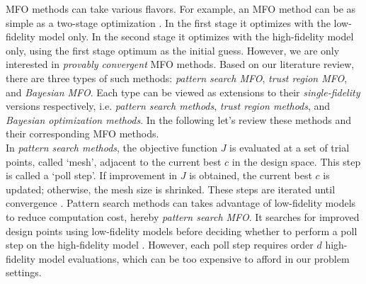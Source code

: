 \documentclass[a4paper,onecolumn]{article}
\theoremstyle{remark}
\begin{document}
\noindent MFO methods can take various flavors.
For example, an MFO method can be as simple as a two-stage optimization \cite{MFO: two stage}. 
In the first stage it optimizes with the low-fidelity model only. In the second stage
it optimizes with the high-fidelity model only, using the first stage optimum as the initial guess.
However, we are only interested in \emph{provably convergent} MFO methods.
Based on our literature review, there are three types of such methods:
\emph{pattern search MFO}, \emph{trust region MFO}, and \emph{Bayesian MFO}.
Each type can be viewed as 
extensions to their \emph{single-fidelity} versions respectively,
i.e. \emph{pattern search methods}, \emph{trust region methods}, and \emph{Bayesian 
optimization methods}. In the following let's review these methods and 
their corresponding MFO methods.\\

\noindent In \emph{pattern search methods}, the objective function $J$ is evaluated at a set of
trial points, called `mesh', adjacent to the current best $c$ in the design space. This
step is called a `poll step'.
If improvement in $J$ is obtained, the current best $c$ is updated; otherwise, the mesh size
is shrinked. 
These steps are iterated until convergence \cite{Pattern Search Convergence}.
Pattern search methods can takes advantage of low-fidelity models to reduce computation cost,
hereby \emph{pattern search MFO}.
It searches for improved design 
points using low-fidelity models before deciding whether to perform a poll step on
the high-fidelity model \cite{Pattern Search Convergence MFO}.
However, each poll step requires order $d$ high-fidelity model evaluations, which can
be too expensive to afford in our problem settings.\\
\end{document}
